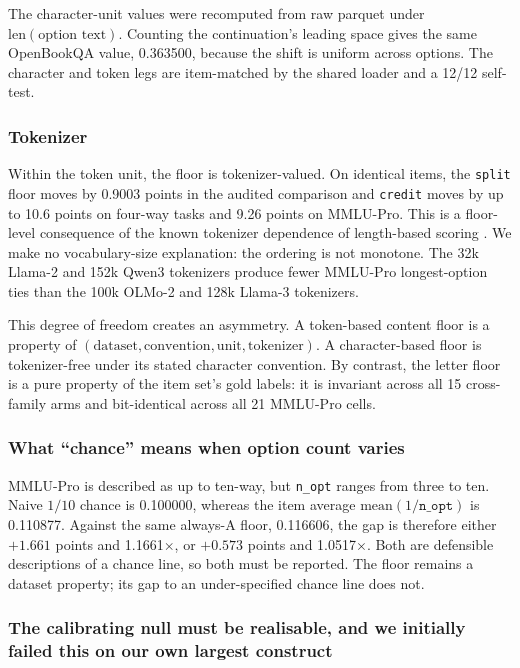 The character-unit values were recomputed from raw parquet under $\mathrm{len}(\text{option text})$. Counting the continuation's leading space gives the same OpenBookQA value, 0.363500, because the shift is uniform across options. The character and token legs are item-matched by the shared loader and a 12/12 self-test.

\subsubsection{Tokenizer}

Within the token unit, the floor is tokenizer-valued. On identical items, the \texttt{split} floor moves by 0.9003 points in the audited comparison and \texttt{credit} moves by up to 10.6 points on four-way tasks and 9.26 points on MMLU-Pro. This is a floor-level consequence of the known tokenizer dependence of length-based scoring \citep{oostermeijer2026length}. We make no vocabulary-size explanation: the ordering is not monotone. The 32k Llama-2 and 152k Qwen3 tokenizers produce fewer MMLU-Pro longest-option ties than the 100k OLMo-2 and 128k Llama-3 tokenizers.

This degree of freedom creates an asymmetry. A token-based content floor is a property of $(\text{dataset},\text{convention},\text{unit},\text{tokenizer})$. A character-based floor is tokenizer-free under its stated character convention. By contrast, the letter floor is a pure property of the item set's gold labels: it is invariant across all 15 cross-family arms and bit-identical across all 21 MMLU-Pro cells.

\subsubsection{What ``chance'' means when option count varies}

MMLU-Pro is described as up to ten-way, but \texttt{n\_opt} ranges from three to ten. Naive $1/10$ chance is 0.100000, whereas the item average $\mathrm{mean}(1/\texttt{n\_opt})$ is 0.110877. Against the same always-A floor, 0.116606, the gap is therefore either $+1.661$ points and 1.1661$\times$, or $+0.573$ points and 1.0517$\times$. Both are defensible descriptions of a chance line, so both must be reported. The floor remains a dataset property; its gap to an under-specified chance line does not.

\subsubsection{The calibrating null must be realisable, and we initially failed this on our own largest construct}
\label{sec:legality-aware-null}

